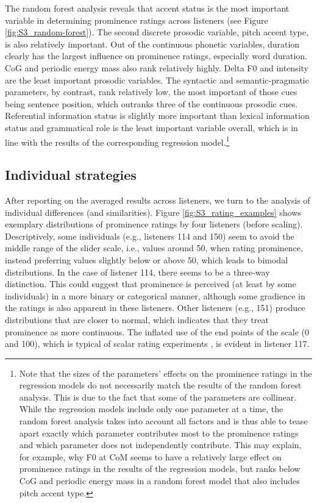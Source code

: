 The random forest analysis reveals that accent status is the most important variable in determining prominence ratings across listeners (see Figure \ref{fig:S3_random-forest}). The second discrete prosodic variable, pitch accent type, is also relatively important. Out of the continuous phonetic variables, duration clearly has the largest influence on prominence ratings, especially word duration. CoG and periodic energy mass also rank relatively highly. Delta F0 and intensity are the least important prosodic variables. The syntactic and semantic-pragmatic parameters, by contrast, rank relatively low, the most important of those cues being sentence position, which outranks three of the continuous prosodic cues. Referential information status is slightly more important than lexical information status and grammatical role is the least important variable overall, which is in line with the results of the corresponding regression model.\footnote{Note that the sizes of the parameters' effects on the prominence ratings in the regression models do not necessarily match the results of the random forest analysis. This is due to the fact that some of the parameters are collinear. While the regression models include only one parameter at a time, the random forest analysis takes into account all factors and is thus able to tease apart exactly which parameter contributes most to the prominence ratings and which parameter does not independently contribute. This may explain, for example, why F0 at CoM seems to have a relatively large effect on prominence ratings in the results of the regression models, but ranks below CoG and periodic energy mass in a random forest model that also includes pitch accent type.}

\subsection{Individual strategies}

After reporting on the averaged results across listeners, we turn to the analysis of individual differences (and similarities). Figure \ref{fig:S3_rating_examples} shows exemplary distributions of prominence ratings by four listeners (before scaling). Descriptively, some individuals (e.g., listeners 114 and 150) seem to avoid the middle range of the slider scale, i.e., values around 50, when rating prominence, instead preferring values slightly below or above 50, which leads to bimodal distributions. In the case of listener 114, there seems to be a three-way distinction. This could suggest that prominence is perceived (at least by some individuals) in a more binary or categorical manner, although some gradience in the ratings is also apparent in these listeners. Other listeners (e.g., 151) produce distributions that are closer to normal, which indicates that they treat prominence as more continuous. The inflated use of the end points of the scale (0 and 100), which is typical of scalar rating experiments \citep[e.g.,][]{vuorreHowAnalyzeVisual2019}, is evident in listener 117.

